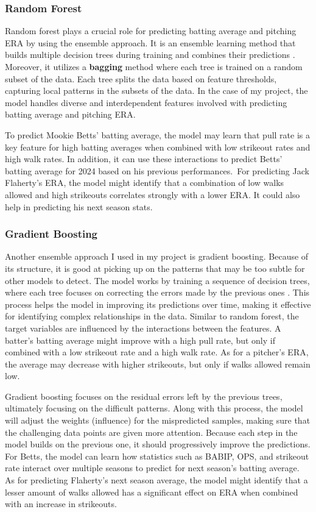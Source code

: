 \documentclass[10pt,twocolumn]{article}
\begin{document}
\subsubsection{Random Forest}

Random forest plays a crucial role for predicting batting average and pitching ERA by using the ensemble approach. It is an ensemble learning method that builds multiple decision trees during training and combines their predictions \cite{7}. Moreover, it utilizes a \textbf{bagging} method where each tree is trained on a random subset of the data. Each tree splits the data based on feature thresholds, capturing local patterns in the subsets of the data. In the case of my project, the model handles diverse and interdependent features involved with predicting batting average and pitching ERA. 

To predict Mookie Betts’ batting average, the model may learn that pull rate is a key feature for high batting averages when combined with low strikeout rates and high walk rates. In addition, it can use these interactions to predict Betts’ batting average for 2024 based on his previous performances. For predicting Jack Flaherty’s ERA, the model might identify that a combination of low walks allowed and high strikeouts correlates strongly with a lower ERA. It could also help in predicting his next season stats. 

\subsubsection{Gradient Boosting}

Another ensemble approach I used in my project is gradient boosting. Because of its structure, it is good at picking up on the patterns that may be too subtle for other models to detect. The model works by training a sequence of decision trees, where each tree focuses on correcting the errors made by the previous ones \cite{8}. This process helps the model in improving its predictions over time, making it effective for identifying complex relationships in the data. Similar to random forest, the target variables are influenced by the interactions between the features. A batter’s batting average might improve with a high pull rate, but only if combined with a low strikeout rate and a high walk rate. As for a pitcher’s ERA, the average may decrease with higher strikeouts, but only if walks allowed remain low. 

 Gradient boosting focuses on the residual errors left by the previous trees, ultimately focusing on the difficult patterns. Along with this process, the model will adjust the weights (influence) for the mispredicted samples, making sure that the challenging data points are given more attention. Because each step in the model builds on the previous one, it should progressively improve the predictions. For Betts, the model can learn how statistics such as BABIP, OPS, and strikeout rate interact over multiple seasons to predict for next season’s batting average. As for predicting Flaherty’s next season average, the model might identify that a lesser amount of walks allowed has a significant effect on ERA when combined with an increase in strikeouts.  
\end{document}
